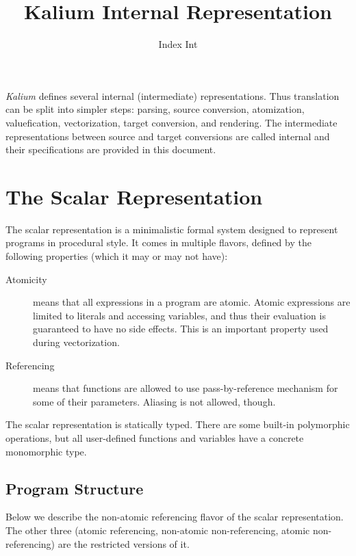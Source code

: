 \documentclass [a4paper] {article}
\title { Kalium Internal Representation }
\author { Index Int }
\begin{document}
\maketitle

\emph{Kalium} defines several internal (intermediate) representations. Thus
translation can be split into simpler steps: parsing, source conversion,
atomization, valuefication, vectorization, target conversion, and rendering. The
intermediate representations between source and target conversions are called
internal and their specifications are provided in this document.

\section { The Scalar Representation }

The scalar representation is a minimalistic formal system designed to represent
programs in procedural style. It comes in multiple flavors, defined by the
following properties (which it may or may not have):

\begin {description}

\item [Atomicity] means that all expressions in a program are atomic. Atomic
expressions are limited to literals and accessing variables, and thus their
evaluation is guaranteed to have no side effects. This is an important property
used during vectorization.

\item [Referencing] means that functions are allowed to use pass-by-reference
mechanism for some of their parameters. Aliasing is not allowed, though.

\end {description}

The scalar representation is statically typed. There are some built-in
polymorphic operations, but all user-defined functions and variables have a
concrete monomorphic type.

\subsection { Program Structure }

Below we describe the non-atomic referencing flavor of the scalar
representation. The other three (atomic referencing, non-atomic non-referencing,
atomic non-referencing) are the restricted versions of it.
\end{document}
